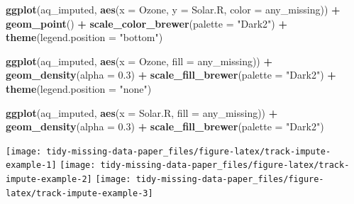 \documentclass[]{article}
\newenvironment{Shaded}{\begin{snugshade}}{\end{snugshade}}
\newcommand{\DataTypeTok}[1]{\textcolor[rgb]{0.13,0.29,0.53}{#1}}
\newcommand{\FloatTok}[1]{\textcolor[rgb]{0.00,0.00,0.81}{#1}}
\newcommand{\KeywordTok}[1]{\textcolor[rgb]{0.13,0.29,0.53}{\textbf{#1}}}
\newcommand{\NormalTok}[1]{#1}
\newcommand{\OperatorTok}[1]{\textcolor[rgb]{0.81,0.36,0.00}{\textbf{#1}}}
\newcommand{\StringTok}[1]{\textcolor[rgb]{0.31,0.60,0.02}{#1}}
\let\origfigure\figure
\let\endorigfigure\endfigure
\renewenvironment{figure}[1][2] {
    \expandafter\origfigure\expandafter[H]
} {
    \endorigfigure
}
\theoremstyle{definition}
\theoremstyle{definition}
\theoremstyle{definition}
\theoremstyle{remark}
\begin{document}
\begin{Shaded}
\begin{Highlighting}[]
\KeywordTok{ggplot}\NormalTok{(aq_imputed,}
       \KeywordTok{aes}\NormalTok{(}\DataTypeTok{x =}\NormalTok{ Ozone,}
           \DataTypeTok{y =}\NormalTok{ Solar.R,}
           \DataTypeTok{color =}\NormalTok{ any_missing)) }\OperatorTok{+}\StringTok{ }
\StringTok{  }\KeywordTok{geom_point}\NormalTok{() }\OperatorTok{+}
\StringTok{  }\KeywordTok{scale_color_brewer}\NormalTok{(}\DataTypeTok{palette =} \StringTok{"Dark2"}\NormalTok{) }\OperatorTok{+}
\StringTok{  }\KeywordTok{theme}\NormalTok{(}\DataTypeTok{legend.position =} \StringTok{"bottom"}\NormalTok{)}

\KeywordTok{ggplot}\NormalTok{(aq_imputed,}
       \KeywordTok{aes}\NormalTok{(}\DataTypeTok{x =}\NormalTok{ Ozone,}
           \DataTypeTok{fill =}\NormalTok{ any_missing)) }\OperatorTok{+}\StringTok{ }
\StringTok{  }\KeywordTok{geom_density}\NormalTok{(}\DataTypeTok{alpha =} \FloatTok{0.3}\NormalTok{) }\OperatorTok{+}\StringTok{ }
\StringTok{  }\KeywordTok{scale_fill_brewer}\NormalTok{(}\DataTypeTok{palette =} \StringTok{"Dark2"}\NormalTok{) }\OperatorTok{+}
\StringTok{  }\KeywordTok{theme}\NormalTok{(}\DataTypeTok{legend.position =} \StringTok{"none"}\NormalTok{)}

\KeywordTok{ggplot}\NormalTok{(aq_imputed,}
       \KeywordTok{aes}\NormalTok{(}\DataTypeTok{x =}\NormalTok{ Solar.R,}
           \DataTypeTok{fill =}\NormalTok{ any_missing)) }\OperatorTok{+}\StringTok{ }
\StringTok{  }\KeywordTok{geom_density}\NormalTok{(}\DataTypeTok{alpha =} \FloatTok{0.3}\NormalTok{) }\OperatorTok{+}\StringTok{ }
\StringTok{  }\KeywordTok{scale_fill_brewer}\NormalTok{(}\DataTypeTok{palette =} \StringTok{"Dark2"}\NormalTok{)}
\end{Highlighting}
\end{Shaded}

\begin{figure}

{\centering \texttt{[image: tidy-missing-data-paper\_files/figure-latex/track-impute-example-1]} \texttt{[image: tidy-missing-data-paper\_files/figure-latex/track-impute-example-2]} \texttt{[image: tidy-missing-data-paper\_files/figure-latex/track-impute-example-3]} 

}

\caption{Scatterplot (A) and density plots (B and C) of ozone and solar radiation from the airquality dataset containing imputed values imputed using simputations `impute\_knn` function, with imputed values colored green and data values orange. Imputed values are similar, but slightly different to existing data.}\label{fig:track-impute-example}
\end{figure}
\end{document}
